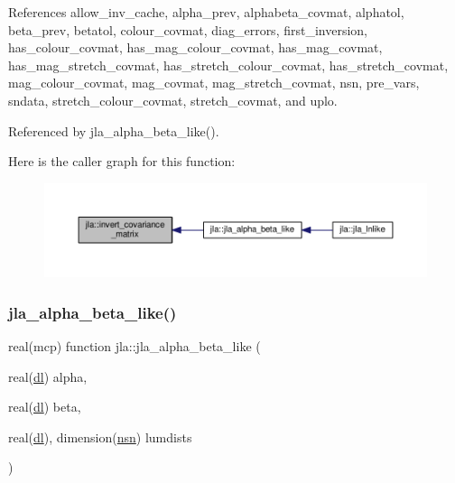 References allow\+\_\+inv\+\_\+cache, alpha\+\_\+prev, alphabeta\+\_\+covmat, alphatol, beta\+\_\+prev, betatol, colour\+\_\+covmat, diag\+\_\+errors, first\+\_\+inversion, has\+\_\+colour\+\_\+covmat, has\+\_\+mag\+\_\+colour\+\_\+covmat, has\+\_\+mag\+\_\+covmat, has\+\_\+mag\+\_\+stretch\+\_\+covmat, has\+\_\+stretch\+\_\+colour\+\_\+covmat, has\+\_\+stretch\+\_\+covmat, mag\+\_\+colour\+\_\+covmat, mag\+\_\+covmat, mag\+\_\+stretch\+\_\+covmat, nsn, pre\+\_\+vars, sndata, stretch\+\_\+colour\+\_\+covmat, stretch\+\_\+covmat, and uplo.



Referenced by jla\+\_\+alpha\+\_\+beta\+\_\+like().

Here is the caller graph for this function\+:
\nopagebreak
\begin{figure}[H]
\begin{center}
\leavevmode
\includegraphics[width=350pt]{namespacejla_a212c8dceda3061fd0e44c6a2834a4196_icgraph}
\end{center}
\end{figure}
\mbox{\label{namespacejla_aaf4f263910da5f17d55cd63613847567}} 
\subsubsection{\texorpdfstring{jla\+\_\+alpha\+\_\+beta\+\_\+like()}{jla\_alpha\_beta\_like()}}
{\footnotesize\ttfamily real(mcp) function jla\+::jla\+\_\+alpha\+\_\+beta\+\_\+like (\begin{DoxyParamCaption}\item[{real(\mbox{\hyperlink{namespacejla_a3aa6435b4e08f1d532390186ac608741}{dl}})}]{alpha,  }\item[{real(\mbox{\hyperlink{namespacejla_a3aa6435b4e08f1d532390186ac608741}{dl}})}]{beta,  }\item[{real(\mbox{\hyperlink{namespacejla_a3aa6435b4e08f1d532390186ac608741}{dl}}), dimension(\mbox{\hyperlink{namespacejla_aff413afd9288880fbc89d3a1f24f60eb}{nsn}})}]{lumdists }\end{DoxyParamCaption})}



